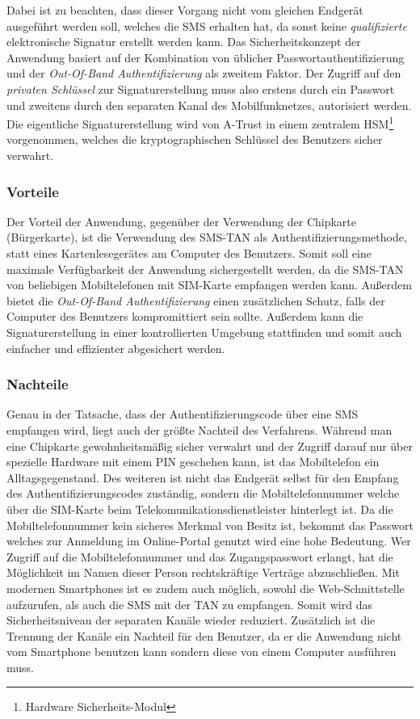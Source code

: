 \documentclass[11pt,a4paper,ngerman]{scrreprt}
\begin{document}
Dabei ist zu beachten, dass dieser Vorgang nicht vom gleichen Endgerät ausgeführt werden soll, welches die SMS erhalten hat, da sonst keine \emph{qualifizierte} elektronische Signatur erstellt werden kann. Das Sicherheitskonzept der Anwendung basiert auf der Kombination von üblicher Passwortauthentifizierung und der \emph{Out-Of-Band Authentifizierung} als zweitem Faktor. Der Zugriff auf den \emph{privaten Schlüssel} zur Signaturerstellung muss also erstens durch ein Passwort und zweitens durch den separaten Kanal des Mobilfunknetzes, autorisiert werden. Die eigentliche Signaturerstellung wird von A-Trust in einem zentralem HSM\footnote{Hardware Sicherheits-Modul} vorgenommen, welches die kryptographischen Schlüssel des Benutzers sicher verwahrt.
\subsubsection{Vorteile}
Der Vorteil der Anwendung, gegenüber der Verwendung der Chipkarte (Bürgerkarte), ist die Verwendung des SMS-TAN als Authentifizierungsmethode, statt eines Kartenlesegerätes am Computer des Benutzers. Somit soll eine maximale Verfügbarkeit der Anwendung sichergestellt werden, da die SMS-TAN von beliebigen Mobiltelefonen mit SIM-Karte empfangen werden kann. Außerdem bietet die \emph{Out-Of-Band Authentifizierung} einen zusätzlichen Schutz, falls der Computer des Benutzers kompromittiert sein sollte. Außerdem kann die Signaturerstellung in einer kontrollierten Umgebung stattfinden und somit auch einfacher und effizienter abgesichert werden.
\subsubsection{Nachteile}
Genau in der Tatsache, dass der Authentifizierungscode über eine SMS empfangen wird, liegt auch der größte Nachteil des Verfahrens. Während man eine Chipkarte gewohnheitsmäßig sicher verwahrt und der Zugriff darauf nur über spezielle Hardware mit einem PIN geschehen kann, ist das Mobiltelefon ein Alltagsgegenstand. Des weiteren ist nicht das Endgerät selbst für den Empfang des Authentifizierungscodes zuständig, sondern die Mobiltelefonnummer welche über die SIM-Karte beim Telekomunikationsdienstleister hinterlegt ist. Da die Mobiltelefonnummer kein sicheres Merkmal von Besitz ist, bekommt das Passwort welches zur Anmeldung im Online-Portal genutzt wird eine hohe Bedeutung. Wer Zugriff auf die Mobiltelefonnummer und das Zugangspasswort erlangt, hat die Möglichkeit im Namen dieser Person rechtskräftige Verträge abzuschließen. Mit modernen Smartphones ist es zudem auch möglich, sowohl die Web-Schnittstelle aufzurufen, als auch die SMS mit der TAN zu empfangen. Somit wird das Sicherheitsniveau der separaten Kanäle wieder reduziert. Zusätzlich ist die Trennung der Kanäle ein Nachteil für den Benutzer, da er die Anwendung nicht vom Smartphone benutzen kann sondern diese von einem Computer ausführen muss.
\end{document}
